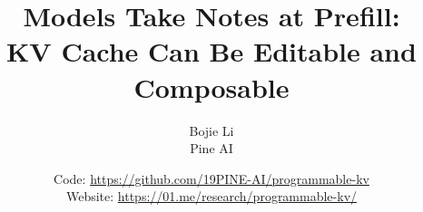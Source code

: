 \documentclass[11pt]{article}
\title{Models Take Notes at Prefill:\\ KV Cache Can Be Editable and Composable}
\author{Bojie Li\\ Pine AI}
\date{\small Code: \url{https://github.com/19PINE-AI/programmable-kv} \\
Website: \url{https://01.me/research/programmable-kv/}}
\begin{document}
\maketitle

\begin{abstract}

\end{abstract}

















\clearpage

\end{document}
